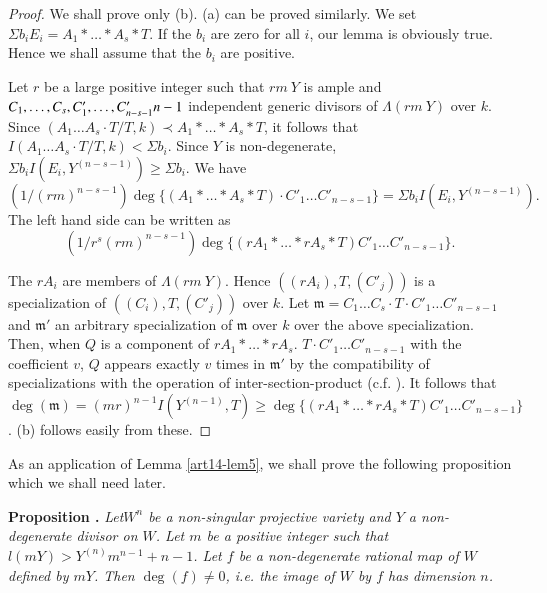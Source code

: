 \begin{proof}
We shall prove only {\rm(b)}. {\rm(a)} can be proved similarly. We set $\Sigma b_{i}E_{i}=A_{1}*\ldots * A_{s}*T$. If the $b_{i}$ are zero for all $i$, our lemma is obviously true. Hence we shall assume that the $b_{i}$ are positive.

Let $r$ be a large positive integer such that $rm\ Y$ is ample and $C_{1},\ldots,\break C_{s},C'_{1},\ldots,C'_{n-s-1}n-1$ independent generic divisors of $\Lambda(rm\ Y)$ over $k$. Since $(A_{1}\ldots A_{s}\cdot T/T, k)\prec A_{1}*\ldots * A_{s} * T$, it follows that $I(A_{1}\ldots A_{s}\cdot T/T,k)<\Sigma b_{i}$. Since $Y$ is non-degenerate, $\Sigma b_{i}I(E_{i},Y^{(n-s-1)})\geq \Sigma b_{i}$. We have
{\fontsize{10pt}{12pt}\selectfont
$$
(1/(rm)^{n-s-1})\deg \{(A_{1}*\ldots * A_{s} * T)\cdot C'_{1}\ldots C'_{n-s-1}\}=\Sigma b_{i}I(E_{i},Y^{(n-s-1)}).
$$}\relax
The left hand side can be written as
$$
(1/r^{s}(rm)^{n-s-1})\deg \{(rA_{1} * \ldots * rA_{s} * T)C'_{1}\ldots C'_{n-s-1}\}.
$$

The $rA_{i}$ are members of $\Lambda(rm\ Y)$. Hence $((rA_{i}), T, (C'_{j}))$ is a specialization of $((C_{i}),T,(C'_{j}))$ over $k$. Let $\mathfrak{m}=C_{1}\ldots C_{s}\cdot T\cdot C'_{1}\ldots C'_{n-s-1}$ and $\mathfrak{m}'$ an arbitrary specialization of $\mathfrak{m}$ over $k$ over the above specialization. Then, when $Q$ is a component of $rA_{1}*\ldots * rA_{s}$. $T\cdot C'_{1}\ldots C'_{n-s-1}$ with the coefficient $v$, $Q$ appears exactly $v$ times in $\mathfrak{m}'$ by the compatibility of specializations with the operation of inter-section-product (c.f. \cite{art14-key24}). It follows that $\deg(\mathfrak{m})=(mr)^{n-1} I(Y^{(n-1)}, T)\geq \deg \{(rA_{1}*\ldots * rA_{s} * T)C'_{1}\ldots C'_{n-s-1}\}$. (b) follows easily from these.
\end{proof}

As an application of Lemma \ref{art14-lem5}, we shall prove the following proposition which we shall need later.

\medskip
\noindent
{\bf Proposition .\label{art14-prop5}}
{\em Let\pageoriginale $W^{n}$ be a non-singular projective variety and $Y$ a non-degenerate divisor on $W$. Let $m$ be a positive integer such that $l(mY)>Y^{(n)}m^{n-1}+n-1$. Let $f$ be a non-degenerate rational map of $W$ defined by $mY$. Then $\deg (f)\neq 0$, i.e. the image of $W$ by $f$ has dimension $n$.}

